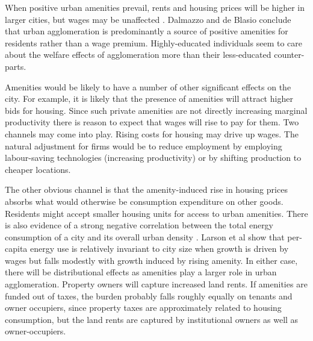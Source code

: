    When positive urban amenities prevail, rents and housing prices will be higher in larger cities, but wages may be unaffected \cite{robackWagesRentsAmenities1988, dalmazzoAmenitiesSkillbiasedAgglomeration2011}. Dalmazzo and  de Blasio\cite{dalmazzoAmenitiesSkillbiasedAgglomeration2011} conclude that urban agglomeration is predominantly a source of positive amenities for residents rather than a wage premium. Highly-educated individuals seem to care about the welfare effects of agglomeration more than their less-educated counter-parts. 


Amenities would be likely to have a number of other significant effects on the city. For example, it is likely that the presence of amenities will attract higher bids for housing. Since such private amenities are not directly increasing marginal productivity there is reason to expect that wages will rise to pay for them. Two channels may come into play. Rising costs for housing may drive up wages. The natural adjustment for firms would be to reduce employment by employing labour-saving technologies (increasing productivity) or by shifting production to cheaper locations.  

The other obvious channel is that the amenity-induced rise in housing prices absorbs what would otherwise be consumption expenditure on other goods. Residents might accept smaller housing units for access to urban amenities. There is also evidence of a strong negative correlation between the total energy consumption of a city and its overall urban density \cite{NewmanPeterJeffrey}. Larson et al show that per-capita energy use is relatively invariant to city size when growth is driven by wages but falls modestly with growth induced by rising amenity. 
In either case, there will be distributional effects as amenities play a larger role in urban agglomeration. Property owners will capture increased land rents. If amenities are funded out of taxes, the burden probably falls roughly equally on tenants and owner occupiers, since property taxes are approximately related to housing consumption, but the land rents are captured by institutional owners as well as owner-occupiers.

